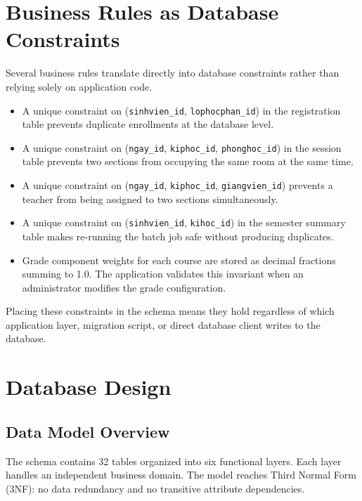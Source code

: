 \documentclass[12pt,a4paper]{report}
\begin{document}
\section{Business Rules as Database Constraints}

Several business rules translate directly into database constraints rather than relying solely on application code.

\begin{itemize}
  \item A unique constraint on (\texttt{sinhvien\_id}, \texttt{lophocphan\_id}) in the registration table prevents duplicate enrollments at the database level.
  \item A unique constraint on (\texttt{ngay\_id}, \texttt{kiphoc\_id}, \texttt{phonghoc\_id}) in the session table prevents two sections from occupying the same room at the same time.
  \item A unique constraint on (\texttt{ngay\_id}, \texttt{kiphoc\_id}, \texttt{giangvien\_id}) prevents a teacher from being assigned to two sections simultaneously.
  \item A unique constraint on (\texttt{sinhvien\_id}, \texttt{kihoc\_id}) in the semester summary table makes re-running the batch job safe without producing duplicates.
  \item Grade component weights for each course are stored as decimal fractions summing to 1.0. The application validates this invariant when an administrator modifies the grade configuration.
\end{itemize}

Placing these constraints in the schema means they hold regardless of which application layer, migration script, or direct database client writes to the database.

\section{Database Design}

\subsection{Data Model Overview}

The schema contains 32 tables organized into six functional layers. Each layer handles an independent business domain. The model reaches Third Normal Form (3NF): no data redundancy and no transitive attribute dependencies.
\end{document}

